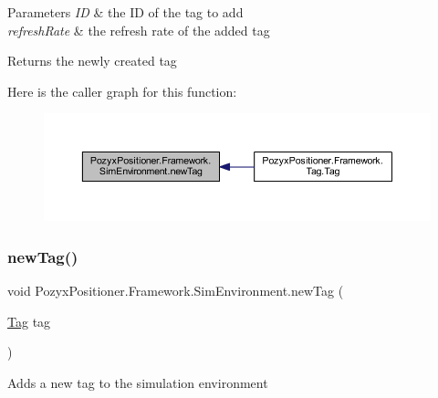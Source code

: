 \begin{DoxyParams}{Parameters}
{\em ID} & the ID of the tag to add\\
\hline
{\em refresh\+Rate} & the refresh rate of the added tag\\
\hline
\end{DoxyParams}
\begin{DoxyReturn}{Returns}
the newly created tag 
\end{DoxyReturn}
Here is the caller graph for this function\+:
\nopagebreak
\begin{figure}[H]
\begin{center}
\leavevmode
\includegraphics[width=350pt]{class_pozyx_positioner_1_1_framework_1_1_sim_environment_ad523ae9a258ae7b68d7f966be92ff3bb_icgraph}
\end{center}
\end{figure}
\mbox{\label{class_pozyx_positioner_1_1_framework_1_1_sim_environment_ae804be21b53900cbac13c0cce385b170}} 
\subsubsection{\texorpdfstring{new\+Tag()}{newTag()}\hspace{0.1cm}{\footnotesize\ttfamily [2/2]}}
{\footnotesize\ttfamily void Pozyx\+Positioner.\+Framework.\+Sim\+Environment.\+new\+Tag (\begin{DoxyParamCaption}\item[{\hyperlink{class_pozyx_positioner_1_1_framework_1_1_tag}{Tag}}]{tag }\end{DoxyParamCaption})}



Adds a new tag to the simulation environment 



